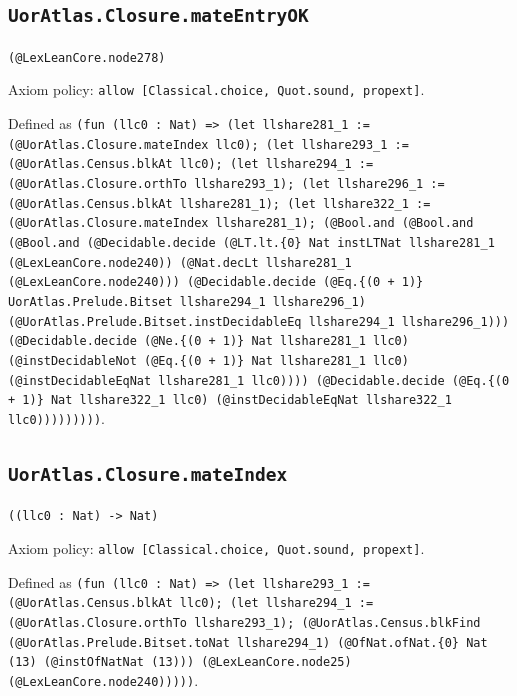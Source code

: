 \documentclass[11pt]{article}
\begin{document}
\subsection*{\texttt{UorAtlas.Closure.mateEntryOK}}
\noindent\texttt{(@LexLeanCore.node278)}\par
\noindent Axiom policy: \texttt{allow [Classical.choice, Quot.sound, propext]}.\par
\noindent Defined as \texttt{(fun (llc0 : Nat) => (let llshare281\_1 := (@UorAtlas.Closure.mateIndex llc0); (let llshare293\_1 := (@UorAtlas.Census.blkAt llc0); (let llshare294\_1 := (@UorAtlas.Closure.orthTo llshare293\_1); (let llshare296\_1 := (@UorAtlas.Census.blkAt llshare281\_1); (let llshare322\_1 := (@UorAtlas.Closure.mateIndex llshare281\_1); (@Bool.and (@Bool.and (@Bool.and (@Decidable.decide (@LT.lt.\{0\} Nat instLTNat llshare281\_1 (@LexLeanCore.node240)) (@Nat.decLt llshare281\_1 (@LexLeanCore.node240))) (@Decidable.decide (@Eq.\{(0 + 1)\} UorAtlas.Prelude.Bitset llshare294\_1 llshare296\_1) (@UorAtlas.Prelude.Bitset.instDecidableEq llshare294\_1 llshare296\_1))) (@Decidable.decide (@Ne.\{(0 + 1)\} Nat llshare281\_1 llc0) (@instDecidableNot (@Eq.\{(0 + 1)\} Nat llshare281\_1 llc0) (@instDecidableEqNat llshare281\_1 llc0)))) (@Decidable.decide (@Eq.\{(0 + 1)\} Nat llshare322\_1 llc0) (@instDecidableEqNat llshare322\_1 llc0)))))))))}.\par
\subsection*{\texttt{UorAtlas.Closure.mateIndex}}
\noindent\texttt{((llc0 : Nat) -> Nat)}\par
\noindent Axiom policy: \texttt{allow [Classical.choice, Quot.sound, propext]}.\par
\noindent Defined as \texttt{(fun (llc0 : Nat) => (let llshare293\_1 := (@UorAtlas.Census.blkAt llc0); (let llshare294\_1 := (@UorAtlas.Closure.orthTo llshare293\_1); (@UorAtlas.Census.blkFind (@UorAtlas.Prelude.Bitset.toNat llshare294\_1) (@OfNat.ofNat.\{0\} Nat (13) (@instOfNatNat (13))) (@LexLeanCore.node25) (@LexLeanCore.node240)))))}.\par
\end{document}
